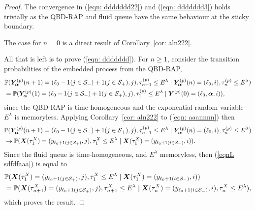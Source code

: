 \begin{proof}
The convergence in (\ref{eqn: ddddddd22}) and (\ref{eqn: ddddddd3}) holds trivially as the QBD-RAP and fluid queue have the same behaviour at the sticky boundary.

The case for \(n=0\) is a direct result of Corollary~\ref{cor: aln222}. %

All that is left is to prove (\ref{eqn: ddddddd}). For \(n\geq 1\), consider the transition probabilities of the embedded process from the QBD-RAP, 
\begin{align}
	&\mathbb P(\bm{Y}_{\bm{\alpha}}^{(p)}(n+1) = (\ell_0-1(j\in\mathcal{S}_-)+1(j\in\mathcal{S}_+),j),\tau_{n+1}^{(p)}\leq E^\lambda
	\mid \bm{Y}_{\bm{\alpha}}^{(p)}(n) = (\ell_0,i),\tau_{n}^{(p)}\leq E^\lambda) \nonumber 
	\\&=\mathbb P(\bm{Y}_{\bm{\alpha}}^{(p)}(1) = (\ell_0-1(j\in\mathcal{S}_-)+1(j\in\mathcal{S}_+), j), \tau_{1}^{(p)}\leq E^\lambda
	\mid \boldsymbol Y^{(p)}(0)=(\ell_0 ,\boldsymbol\alpha, i)), \label{eqn: aaannnn}
\end{align}
since the QBD-RAP is time-homogeneous and the exponential random variable \(E^\lambda\) is memoryless. %
Applying Corollary~\ref{cor: aln222} to (\ref{eqn: aaannnn}) then
\begin{align}
	&\mathbb P(\bm{Y}_{\bm{\alpha}}^{(p)}(n+1) = (\ell_0-1(j\in\mathcal{S}_-)+1(j\in\mathcal{S}_+),j),\tau_{n+1}^{(p)}\leq E^\lambda
	\mid \bm{Y}_{\bm{\alpha}}^{(p)}(n) = (\ell_0,i),\tau_{n}^{(p)}\leq E^\lambda) \nonumber 
	\\&\to \mathbb P(\boldsymbol X(\tau_{1}^X) = (y_{\ell_0+1(j\in\mathcal{S}_+)}, j), \tau_{1}^{X}\leq E^\lambda \mid \boldsymbol X(\tau_{1}^X) = (y_{\ell_0+1(i\in\mathcal{S}_-)},i)).\label{eqnL sdfdfaaa}
\end{align}
Since the fluid queue is time-homogeneous, and \(E^\lambda\) memoryless, then (\ref{eqnL sdfdfaaa}) is equal to 
\begin{align}
	&\mathbb P(\boldsymbol X(\tau_{1}^X) = (y_{\ell_0+1(j\in\mathcal{S}_+)}, j), \tau_{1}^{X}\leq E^\lambda \mid \boldsymbol X(\tau_{1}^X) = (y_{\ell_0+1(i\in\mathcal{S}_-)},i))
	\\&=\mathbb P(\boldsymbol X(\tau_{n+1}^X) = (y_{\ell_0+1(j\in\mathcal{S}_+)}, j), \tau_{n+1}^{X}\leq E^\lambda \mid \boldsymbol X(\tau_{n}^X) = (y_{\ell_0+1(i\in\mathcal{S}_-)},i), \tau_{n}^{X}\leq E^\lambda ),
\end{align}
which proves the result. 
\end{proof}

